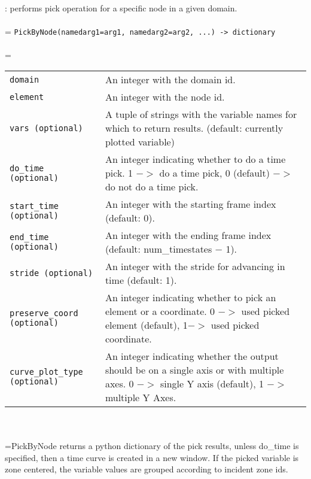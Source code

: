 \documentclass[10pt,a4paper]{report}
\begin{document}
{}
: performs pick operation for a specific node in a given domain.\\[-3mm]

 \\ 
\hangindent=\parindent 
\verb!PickByNode(namedarg1=arg1, namedarg2=arg2, ...) -> dictionary!\\ [-3mm]

 \\ 
\hangindent=\parindent 
\begin{tabular}{lp{9cm}}
\verb!domain! & An integer with the domain id. \\
\verb!element! & An integer with the node id. \\
\verb!vars (optional)! & A tuple of strings with the variable names for which to return results. (default: currently plotted variable) \\
\verb!do_time (optional)! & An integer indicating whether to do a time pick. 1 $-$$>$ do a time pick, 0 (default) $-$$>$ do not do a time pick. \\
\verb!start_time (optional)! & An integer with the starting frame index (default: 0). \\
\verb!end_time (optional)! & An integer with the ending frame index (default: num\_timestates $-$ 1). \\
\verb!stride (optional)! & An integer with the stride for advancing in time (default: 1). \\
\verb!preserve_coord (optional)! & An integer indicating whether to pick an element or a coordinate. 0 $-$$>$ used picked element (default), 1$-$$>$ used picked coordinate. \\
\verb!curve_plot_type (optional)! & An integer indicating whether the output should be on a single axis or with multiple axes. 0 $-$$>$ single Y axis (default), 1 $-$$>$ multiple Y Axes. \\
\end{tabular} \\[-2mm]


 \\ 
\hangindent=\parindent PickByNode returns a python dictionary of the pick results, unless do\_time is specified, then a time curve is created in a new window. If the picked variable is zone centered, the variable values are grouped according to incident zone ids. \\[-3mm] 
\end{document}
